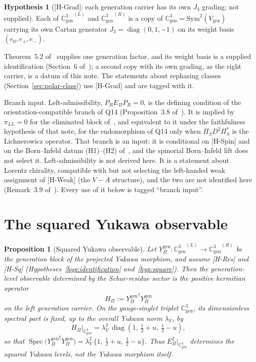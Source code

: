 \documentclass[11pt]{article}
\newtheorem{proposition}{Proposition}
\theoremstyle{definition}
\newtheorem{hypothesis}{Hypothesis}
\theoremstyle{remark}
\newcommand{\Jthree}{J_{3}}
\newcommand{\Cgen}{\mathbb{C}^{3}_{\mathrm{gen}}}
\newcommand{\Epi}{E_{\Pi}}
\newcommand{\GL}{{\Cgen}^{(L)}}
\newcommand{\GR}{{\Cgen}^{(R)}}
\newcommand{\Ygen}{{Y^{\mathrm{gen}}_{\Pi}}}
\newcommand{\Hpi}{H_{\Pi}}
\newcommand{\lamY}{\lambda_{Y}}
\newcommand{\Sym}{\mathrm{Sym}}
\newcommand{\diag}{\operatorname{diag}}
\newcommand{\Spec}{\operatorname{Spec}}
\begin{document}
    \begin{hypothesis}[{[H-Grad]}: each generation carrier has its own $\Jthree$ grading; not supplied]
      \label{hyp:grading}
      Each of $\GL$ and $\GR$ is a copy of $\Cgen = \Sym^{2}(V_{\mathrm{gen}})$ carrying its own Cartan generator
      $\Jthree = \diag(0, 1, -1)$ on its weight basis $(e_{0}, e_{+}, e_{-})$.
    \end{hypothesis}

    Theorem~5.2 of~\cite{Beau2026q14} supplies one generation factor, and its weight basis is a supplied identification
    (Section~6 of~\cite{Beau2026q14}); a second copy with its own grading, as the right carrier, is a datum of this
    note.
    The statements about rephasing classes (Section~\ref{sec:polar-class}) use [H-Grad] and are tagged with it.

    Branch input.
    Left-admissibility, $P_{R}\Epi P_{R} = 0$, is the defining condition of the orientation-compatible branch of Q14
    (Proposition~3.8 of~\cite{Beau2026q14}).
    It is implied by $\pi_{LL} = 0$ for the eliminated block of~\cite{Beau2026prs}, and equivalent to it under the
    faithfulness hypothesis of that note, for the endomorphism of Q14 only when $\Pi_{S} D^{2} \Pi_{S}^{*}$ is the
    Lichnerowicz operator.
    That branch is an input: it is conditional on [H-Spin] and on the Born--Infeld datum (H1)--(H2)
    of~\cite{Beau2026a34}, and the spinorial Born--Infeld lift does not select it.
    Left-admissibility is not derived here.
    It is a statement about Lorentz chirality, compatible with but not selecting the left-handed weak assignment of
    [H-Weak] (the $V{-}A$ structure), and the two are not identified here (Remark~3.9 of~\cite{Beau2026q14}).
    Every use of it below is tagged ``branch input''.

  \section{The squared Yukawa observable}
    \label{sec:squared}

    \begin{proposition}[Squared Yukawa observable]
      \label{prop:squared-yukawa}
      Let $\Ygen : \GL \to \GR$ be the generation block of the projected Yukawa morphism, and assume [H-Res] and [H-Sq]
      (Hypotheses~\ref{hyp:identification} and~\ref{hyp:square}).
      Then the generation-level observable determined by the Schur-residue sector is the positive hermitian
      operator
      \[
        \Hpi := \Ygen^{\dagger}\Ygen
      \]
      on the left generation carrier.
      On the gauge-singlet triplet $\Cgen$, its dimensionless spectral part is fixed, up to the overall
      Yukawa norm $\lamY$, by
      \[
        \Hpi\big|_{\Cgen} = \lamY^{2}\,\diag\!\left(1,\ \tfrac12 + u,\ \tfrac12 - u\right) ,
      \]
      so that $\Spec\big(\Ygen^{\dagger}\Ygen\big) = \lamY^{2}\,\{1,\ \tfrac12 + u,\ \tfrac12 - u\}$.
      Thus $\Epi^{2}|_{\Cgen}$ determines the squared Yukawa levels, not the Yukawa morphism itself.
    \end{proposition}
\end{document}
